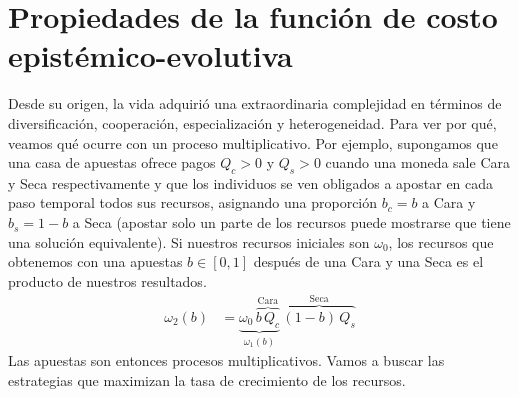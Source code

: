 \documentclass[a4paper,11pt]{book}
\theoremstyle{definition}
\begin{document}

\section{Propiedades de la funci\'on de costo epist\'emico-evolutiva} \label{sec:propiedades_funcion_costo}
Desde su origen, la vida adquiri\'o una extraordinaria complejidad en t\'erminos de diversificaci\'on, cooperaci\'on, especializaci\'on y heterogeneidad.
%
Para ver por qu\'e, veamos qu\'e ocurre con un proceso multiplicativo.
%
Por ejemplo, supongamos que una casa de apuestas ofrece pagos $Q_c > 0$ y $Q_s > 0$ cuando una moneda sale Cara y Seca respectivamente y que los individuos se ven obligados a apostar en cada paso temporal todos sus recursos, asignando una proporci\'on $b_c = b$ a Cara y $b_s = 1 - b$ a Seca (apostar solo un parte de los recursos puede mostrarse que tiene una soluci\'on equivalente).
%
Si nuestros recursos iniciales son $\omega_0$, los recursos que obtenemos con una apuestas $b \in [0,1]$ despu\'es de una Cara y una Seca es el producto de nuestros resultados.
%
 \begin{equation*}
\begin{split}
\omega_2(b) & = \underbrace{\omega_0 \, \overbrace{b \,  Q_c}^{\text{Cara}}}_{\omega_1(b)} \, \overbrace{(1-b) \, Q_s}^{\text{Seca}}
\end{split}
\end{equation*}
%
Las apuestas son entonces procesos multiplicativos.
%
Vamos a buscar las estrategias que maximizan la tasa de crecimiento de los recursos.
\end{document}
